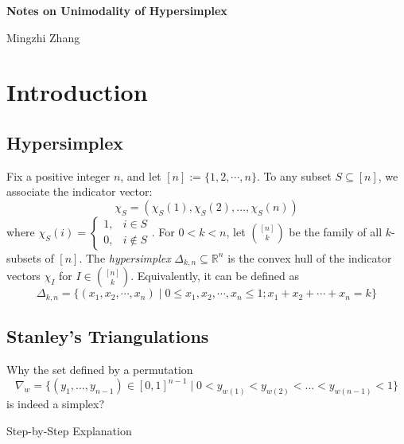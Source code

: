 \documentclass[12pt]{article}
\theoremstyle{definition}
\numberwithin{equation}{subsection}
\begin{document}
\begin{center}
{\Large\bf 
Notes on Unimodality of Hypersimplex
}\\ [7pt]
\end{center}

\vskip 3mm

\begin{center}
Mingzhi Zhang
\end{center}

\vskip 3mm

\section{Introduction}

\subsection{Hypersimplex}
Fix a positive integer $n$, and let $[n]:= \{1, 2, \cdots , n\}$. To any subset $S \subseteq [n]$, we associate the indicator vector:
\[
\chi_{S} = (\chi_{S}(1), \chi_{S}(2), \ldots, \chi_{S}(n))
\]
where 
$\chi_{S}(i) = 
\begin{cases} 
1, & i \in S \\
0, & i \notin S
\end{cases}$.
For $0 < k < n$, let $\binom{[n]}{k}$ be the family of all $k$-subsets of $[n]$. The \textit{hypersimplex} $\Delta_{k,n} \subseteq \mathbb{R}^n$ is the convex hull of the indicator vectors $\chi_I$ for $I \in \binom{[n]}{k}$. Equivalently, it can be defined as
\[
\Delta_{k,n} = \{(x_1, x_2, \cdots, x_n) \mid 0 \leq x_1, x_2, \cdots, x_n \leq 1; x_1 + x_2 + \cdots + x_n = k\}
\]


\subsection{Stanley's Triangulations}
Why the set defined by a permutation
$$
\nabla_w = \{(y_1,\dots,y_{n-1})\in [0,1]^{n-1} \mid 0 < y_{w(1)} < y_{w(2)} < \dots < y_{w(n-1)} < 1\}
$$
is indeed a simplex?

Step-by-Step Explanation
\end{document}
